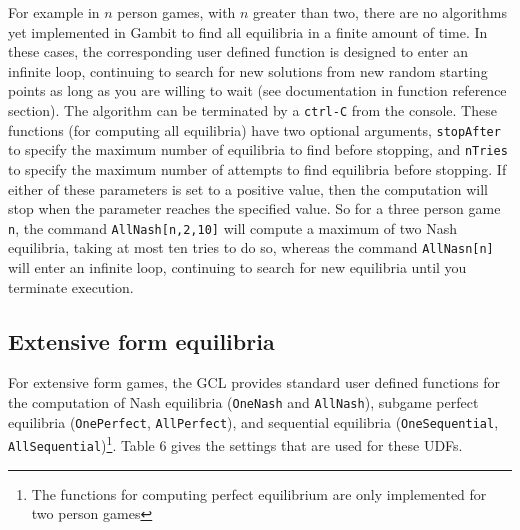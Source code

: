 For example in $n$ person games, with $n$ greater than two, there are
no algorithms yet implemented in Gambit to find all equilibria in a
finite amount of time.  In these cases, the corresponding user defined
function is designed to enter an infinite loop, continuing to search
for new solutions from new random starting points as long as you are
willing to wait (see documentation in function reference section).
The algorithm can be terminated by a \verb+ctrl-C+ from the console.
These functions (for computing all equilibria) have two optional
arguments, \verb+stopAfter+ to specify the maximum number of
equilibria to find before stopping, and \verb+nTries+ to specify the
maximum number of attempts to find equilibria before stopping. If
either of these parameters is set to a positive value, then the
computation will stop when the parameter reaches the specified value.
So for a three person game \verb+n+, the command
\verb+AllNash[n,2,10]+ will compute a maximum of two Nash equilibria,
taking at most ten tries to do so, whereas the command
\verb+AllNasn[n]+ will enter an infinite loop, continuing to search
for new equilibria until you terminate execution.

\subsection{Extensive form equilibria}

For extensive form games, the GCL provides standard user defined
functions for the computation of Nash equilibria (\texttt{OneNash} and \texttt{AllNash}), subgame perfect
equilibria (\texttt{OnePerfect}, \texttt{AllPerfect}), and sequential
equilibria (\texttt{OneSequential},
\texttt{AllSequential})\footnote{The functions for computing perfect
equilibrium are only implemented for two person games}.  Table 6 gives
the settings that are used for these UDFs.  

